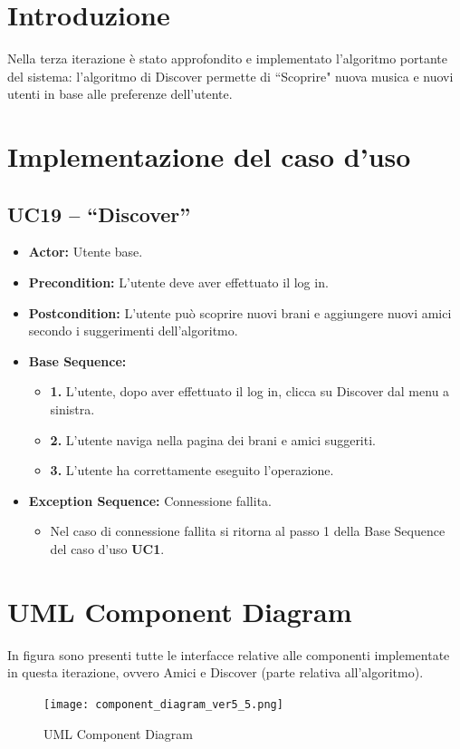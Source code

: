 \section{Introduzione}
Nella terza iterazione è stato approfondito e implementato l'algoritmo portante del sistema: l'algoritmo di Discover permette di ``Scoprire" nuova 
musica e nuovi utenti in base alle preferenze dell'utente.

\section{Implementazione del caso d'uso}
\subsection{UC19 -- ``Discover''}
\begin{itemize}
    \item \textbf{Actor:} Utente base.
    \item \textbf{Precondition:} L'utente deve aver effettuato il log in.
    \item \textbf{Postcondition:} L'utente può scoprire nuovi brani e aggiungere nuovi amici secondo i suggerimenti dell'algoritmo. 
    \item \textbf{Base Sequence:}
    \begin{itemize}
        \item \textbf{1.} L'utente, dopo aver effettuato il log in, clicca su Discover dal menu a sinistra.
        \item \textbf{2.} L'utente naviga nella pagina dei brani e amici suggeriti.
        \item \textbf{3.} L'utente ha correttamente eseguito l'operazione.
    \end{itemize}
    \item \textbf{Exception Sequence:} Connessione fallita.
    \begin{itemize}
        \item Nel caso di connessione fallita si ritorna al passo 1 della Base Sequence del caso d'uso \textbf{UC1}.
    \end{itemize}
\end{itemize}
\vspace{1cm}

\section{UML Component Diagram}
In figura sono presenti tutte le interfacce
relative alle componenti implementate in questa iterazione, 
ovvero Amici e Discover (parte relativa all'algoritmo).
\begin{figure}[H]
    \centering
    \texttt{[image: component\_diagram\_ver5\_5.png]} 
    \caption{UML Component Diagram}
    \label{fig-uml-component-diag_5}
\end{figure}

